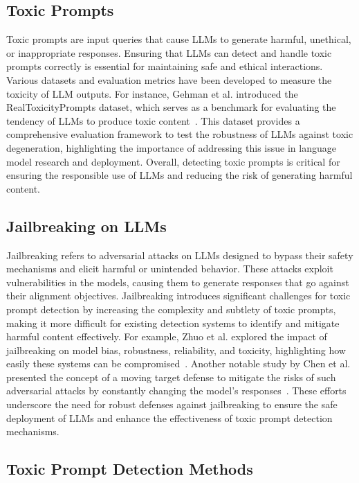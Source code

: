 \subsection{Toxic Prompts}

Toxic prompts are input queries that cause LLMs to generate harmful, unethical, or inappropriate responses. Ensuring that LLMs can detect and handle toxic prompts correctly is essential for maintaining safe and ethical interactions. Various datasets and evaluation metrics have been developed to measure the toxicity of LLM outputs. For instance, Gehman et al. introduced the RealToxicityPrompts dataset, which serves as a benchmark for evaluating the tendency of LLMs to produce toxic content~\cite{gehman2020realtoxicityprompts}. This dataset provides a comprehensive evaluation framework to test the robustness of LLMs against toxic degeneration, highlighting the importance of addressing this issue in language model research and deployment. Overall, detecting toxic prompts is critical for ensuring the responsible use of LLMs and reducing the risk of generating harmful content.

\subsection{Jailbreaking on LLMs}

Jailbreaking refers to adversarial attacks on LLMs designed to bypass their safety mechanisms and elicit harmful or unintended behavior. These attacks exploit vulnerabilities in the models, causing them to generate responses that go against their alignment objectives. Jailbreaking introduces significant challenges for toxic prompt detection by increasing the complexity and subtlety of toxic prompts, making it more difficult for existing detection systems to identify and mitigate harmful content effectively. For example, Zhuo et al. explored the impact of jailbreaking on model bias, robustness, reliability, and toxicity, highlighting how easily these systems can be compromised~\cite{zhuo2023red}. Another notable study by Chen et al. presented the concept of a moving target defense to mitigate the risks of such adversarial attacks by constantly changing the model's responses~\cite{jailbreak-in-jail}. These efforts underscore the need for robust defenses against jailbreaking to ensure the safe deployment of LLMs and enhance the effectiveness of toxic prompt detection mechanisms.

\subsection{Toxic Prompt Detection Methods}

